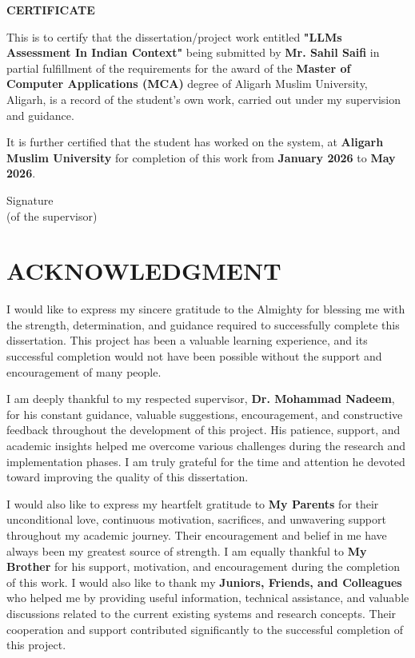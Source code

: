 \documentclass[12pt, a4paper, onecolumn]{report}
\begin{document}
\newpage
\begin{center}
    \Huge \textbf{CERTIFICATE}
\end{center}
\vspace{1cm}
This is to certify that the dissertation/project work entitled \textbf{"LLMs Assessment In Indian Context"} being submitted by \textbf{Mr. Sahil Saifi} in partial fulfillment of the requirements for the award of the \textbf{Master of Computer Applications (MCA)} degree of Aligarh Muslim University, Aligarh, is a record of the student’s own work, carried out under my supervision and guidance.

It is further certified that the student has worked on the \textbf{} system, at \textbf{Aligarh Muslim University} for completion of this work from \textbf{January 2026} to \textbf{May 2026}.

\vspace{3cm}
\noindent
Signature \\
(of the supervisor) \\


\newpage
\chapter*{ACKNOWLEDGMENT}
I would like to express my sincere gratitude to the Almighty for blessing me with the strength, determination, and guidance required to successfully complete this dissertation. This project has been a valuable learning experience, and its successful completion would not have been possible without the support and encouragement of many people.

I am deeply thankful to my respected supervisor, \textbf{Dr. Mohammad Nadeem}, for his constant guidance, valuable suggestions, encouragement, and constructive feedback throughout the development of this project. His patience, support, and academic insights helped me overcome various challenges during the research and implementation phases. I am truly grateful for the time and attention he devoted toward improving the quality of this dissertation.

I would also like to express my heartfelt gratitude to \textbf{My Parents} for their unconditional love, continuous motivation, sacrifices, and unwavering support throughout my academic journey. Their encouragement and belief in me have always been my greatest source of strength. I am equally thankful to \textbf{My Brother} for his support, motivation, and encouragement during the completion of this work. I would also like to thank my \textbf{Juniors, Friends, and Colleagues} who helped me by providing useful information, technical assistance, and valuable discussions related to the current existing systems and research concepts. Their cooperation and support contributed significantly to the successful completion of this project.
\end{document}

